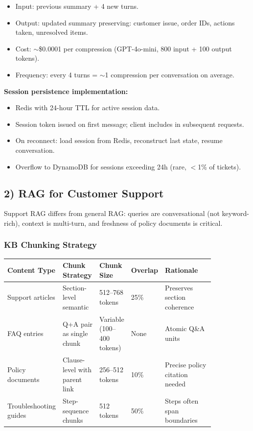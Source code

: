 \begin{itemize}
  \item Input: previous summary + 4 new turns.
  \item Output: updated summary preserving: customer issue, order IDs, actions taken, unresolved items.
  \item Cost: $\sim$\$0.0001 per compression (GPT-4o-mini, 800 input + 100 output tokens).
  \item Frequency: every 4 turns = $\sim$1 compression per conversation on average.
\end{itemize}

\textbf{Session persistence implementation:}

\begin{itemize}
  \item Redis with 24-hour TTL for active session data.
  \item Session token issued on first message; client includes in subsequent requests.
  \item On reconnect: load session from Redis, reconstruct last state, resume conversation.
  \item Overflow to DynamoDB for sessions exceeding 24h (rare, $<$1\% of tickets).
\end{itemize}

\subsection*{2) RAG for Customer Support}

Support RAG differs from general RAG: queries are conversational (not keyword-rich), context is multi-turn, and freshness of policy documents is critical.

\subsubsection*{KB Chunking Strategy}

\small
\begin{tabular}{|p{0.14\linewidth}|p{0.18\linewidth}|p{0.14\linewidth}|p{0.10\linewidth}|p{0.28\linewidth}|}
\hline
\textbf{Content Type} & \textbf{Chunk Strategy} & \textbf{Chunk Size} & \textbf{Overlap} & \textbf{Rationale} \\
\hline
Support articles & Section-level semantic & 512--768 tokens & 25\% & Preserves section coherence \\
\hline
FAQ entries & Q+A pair as single chunk & Variable (100--400 tokens) & None & Atomic Q\&A units \\
\hline
Policy documents & Clause-level with parent link & 256--512 tokens & 10\% & Precise policy citation needed \\
\hline
Troubleshooting guides & Step-sequence chunks & 512 tokens & 50\% & Steps often span boundaries \\
\hline
\end{tabular}
\normalsize

